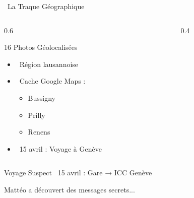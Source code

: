 \documentclass{beamer}
\begin{document}
\begin{frame}{\faMapO \, La Traque Géographique}
\begin{columns}
\begin{column}{0.6\textwidth}
\begin{block}{16 Photos Géolocalisées}
\begin{itemize}
    \item \faMapMarker \, Région lausannoise
    \item \faHome \, Cache Google Maps :
    \begin{itemize}
        \item Bussigny
        \item Prilly  
        \item Renens
    \end{itemize}
    \item \faTrain \, 15 avril : Voyage à Genève
\end{itemize}
\end{block}
\end{column}

\begin{column}{0.4\textwidth}
\begin{center}
\fbox{\begin{minipage}{3cm}
\centering
\textcolor{gray}{Carte\\Suisse\\Déplacements}
\end{minipage}}
\end{center}
\end{column}
\end{columns}

\pause
\begin{alertblock}{Voyage Suspect}
\faCalendar \, 15 avril : Gare → ICC Genève
\end{alertblock}

\pause
\begin{center}
\Large{\textcolor{crimsonred}{Mattéo a découvert des messages secrets...}}
\end{center}
\end{frame}
\end{document}
